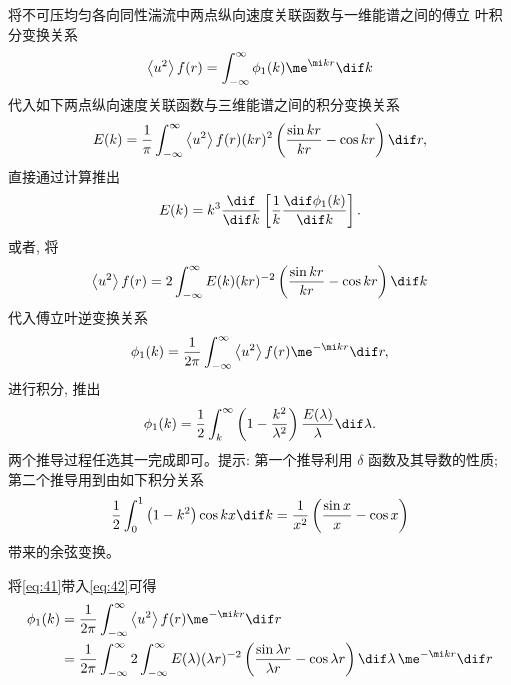 \documentclass[12pt,a4]{ctexart}
\begin{document}
将不可压均匀各向同性湍流中两点纵向速度关联函数与一维能谱之间的傅立 叶积分变换关系
\begin{equation}
   \left\langle u^{2}\right\rangle f(r)=\int_{-\infty}^{\infty} \phi_{1}(k) \me^{\mi k r}\dif k
\end{equation}
代入如下两点纵向速度关联函数与三维能谱之间的积分变换关系
\begin{equation}
   E(k)=\frac{1}{\pi} \int_{-\infty}^{\infty}\left\langle u^{2}\right\rangle f(r)(k r)^{2}\left(\frac{\sin k r}{k r}-\cos k r\right) \dif r,
\end{equation}
直接通过计算推出
\begin{equation}
   E(k)=k^{3} \frac{\dif}{\dif k}\left[\frac{1}{k} \frac{\dif \phi_{1}(k)}{\dif k}\right].
\end{equation}
或者, 将
\begin{equation}
   \left\langle u^{2}\right\rangle f(r)=2 \int_{-\infty}^{\infty} E(k)(k r)^{-2}\left(\frac{\sin k r}{k r}-\cos k r\right)\dif k
   \label{eq:41}
\end{equation}
代入傅立叶逆变换关系
\begin{equation}
   \phi_{1}(k)=\frac{1}{2 \pi} \int_{-\infty}^{\infty}\left\langle u^{2}\right\rangle f(r) \me^{-\mi k r} \dif r,
   \label{eq:42}
\end{equation}
进行积分, 推出
\begin{equation}
   \phi_{1}(k)=\frac{1}{2} \int_{k}^{\infty}\left(1-\frac{k^{2}}{\lambda^{2}}\right) \frac{E(\lambda)}{\lambda} \dif \lambda.
\end{equation}
两个推导过程任选其一完成即可。提示: 第一个推导利用 $\delta$ 函数及其导数的性质; 第二个推导用到由如下积分关系
\begin{equation}
   \frac{1}{2} \int_{0}^{1}\left(1-k^{2}\right) \cos k x \dif k=\frac{1}{x^{2}}\left(\frac{\sin x}{x}-\cos x\right)
   \label{eq:43}
\end{equation}
带来的余弦变换。

将\cref{eq:41}带入\cref{eq:42}可得
\begin{equation}
   \begin{aligned}
	  \phi_{1}(k) & = \frac{1}{2 \pi} \int_{-\infty}^{\infty}\left\langle u^{2}\right\rangle f(r) \me^{-\mi k r} \dif r \\ 
				  & = \frac{1}{2 \pi} \int_{-\infty}^{\infty}2 \int_{-\infty}^{\infty} E(\lambda)(\lambda r)^{-2}\left(\frac{\sin \lambda r}{\lambda r}-\cos \lambda r\right)\dif \lambda \, \me^{-\mi k r} \dif r \\
   \end{aligned}
\end{equation}
\end{document}
